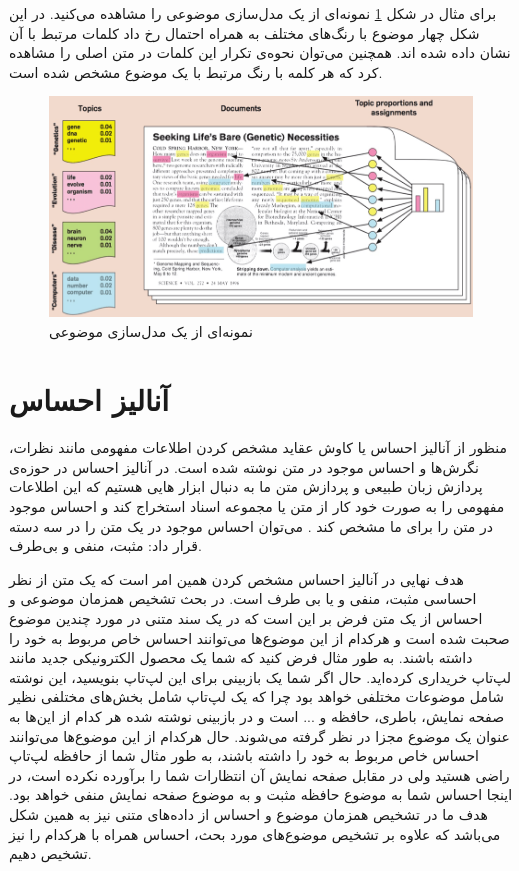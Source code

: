 برای مثال در شکل
\ref{fig2}
نمونه‌ای از یک مدل‌سازی موضوعی را مشاهده می‌‌کنید. در این شکل چهار موضوع با رنگ‌های مختلف به همراه احتمال رخ داد کلمات مرتبط با آن نشان داده شده اند. همچنین می‌‌توان نحوه‌ی تکرار این کلمات در متن اصلی‌ را مشاهده کرد که هر کلمه با رنگ مرتبط با یک موضوع مشخص شده است.
\begin{figure}[!t]
	\centering
	\includegraphics[scale=0.5]{chap2-img/topic_model_example2}
	\caption{نمونه‌ای از یک مدل‌سازی موضوعی}
	\label{fig2}
\end{figure}


\section{آنالیز احساس}
منظور از آنالیز احساس یا کاوش عقاید مشخص کردن اطلاعات مفهومی‌
مانند نظرات، نگرش‌ها و احساس موجود در متن نوشته شده است. در آنالیز احساس در حوزه‌ی ‌‌پردازش زبان طبیعی و پردازش متن ما به دنبال ابزار هایی هستیم که این اطلاعات مفهومی‌ را به صورت خود کار از متن یا مجموعه اسناد استخراج کند و احساس موجود در متن را برای ما مشخص کند
\cite{lin2012weakly}\cite{pang2008opinion}.
 می‌توان احساس موجود در یک متن را در سه‌ دسته قرار داد: مثبت، منفی‌ و بی‌طرف.

هدف نهایی در آنالیز احساس مشخص کردن همین امر است  که یک متن از نظر احساسی‌ مثبت، منفی‌ و یا بی‌ طرف است. در بحث تشخیص همزمان موضوعی و احساس از یک متن فرض بر این است که در یک سند متنی در مورد چندین موضوع صحبت شده است و هرکدام از این موضوع‌ها می‌‌توانند احساس خاص مربوط به خود را داشته باشند. به طور مثال فرض کنید که شما یک محصول الکترونیکی جدید مانند لپ‌تاپ خریداری کرده‌اید. حال اگر شما یک بازبینی
برای این لپ‌تاپ بنویسید، این نوشته شامل موضوعات مختلفی‌ خواهد بود چرا که یک لپ‌تاپ شامل بخش‌های مختلفی‌ نظیر صفحه نمایش، باطری، حافظه و ... است و در بازبینی نوشته شده هر کدام از این‌ها به عنوان یک موضوع مجزا در نظر گرفته می‌‌شوند. حال هرکدام از این موضوع‌ها می‌‌توانند احساس خاص مربوط به خود را داشته باشند، به طور مثال شما از حافظه لپ‌تاپ راضی‌ هستید ولی‌ در مقابل صفحه نمایش آن انتظارات شما را برآورده نکرده است، در اینجا احساس شما به موضوع حافظه مثبت و به موضوع صفحه نمایش منفی‌ خواهد بود. هدف ما در تشخیص همزمان موضوع و احساس از داده‌های متنی نیز به همین شکل می‌باشد که علاوه بر تشخیص موضوع‌های مورد بحث، احساس همراه با هرکدام را نیز تشخیص دهیم.


